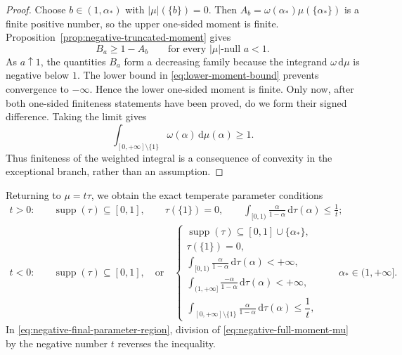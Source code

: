 \documentclass[aps,pra,11pt,onecolumn,nofootinbib,tightenlines]{revtex4-2}
\theoremstyle{definition}
\begin{document}
\begin{proof}
Choose $b\in(1,\alpha_*)$ with $|\mu|(\{b\})=0$. Then $A_b=\omega(\alpha_*)\mu(\{\alpha_*\})$ is a finite positive number, so the upper one-sided moment is finite. Proposition~\ref{prop:negative-truncated-moment} gives
\begin{equation}
 B_a\geq1-A_b
 \qquad\text{for every $|\mu|$-null }a<1.
 \label{eq:lower-moment-bound}
\end{equation}
As $a\uparrow1$, the quantities $B_a$ form a decreasing family because the integrand $\omega\,\mathrm d\mu$ is negative below $1$. The lower bound in \eqref{eq:lower-moment-bound} prevents convergence to $-\infty$. Hence the lower one-sided moment is finite. Only now, after both one-sided finiteness statements have been proved, do we form their signed difference. Taking the limit gives
\begin{equation}
 \int_{[0,+\infty]\setminus\{1\}}
 \omega(\alpha)\,\mathrm d\mu(\alpha)
 \geq1.
 \label{eq:negative-full-moment-mu}
\end{equation}
Thus finiteness of the weighted integral is a consequence of convexity in the exceptional branch, rather than an assumption.
\end{proof}

Returning to $\mu=t\tau$, we obtain the exact temperate parameter conditions
\begin{align}
 t>0:\quad&
 \operatorname{supp}(\tau)\subseteq[0,1],
 \qquad
 \tau(\{1\})=0,
 \qquad
 \int_{[0,1)}\frac{\alpha}{1-\alpha}\,\mathrm d\tau(\alpha)
 \leq\frac1t;
 \label{eq:positive-final-parameter-region}\\
 t<0:\quad&
 \operatorname{supp}(\tau)\subseteq[0,1],
 \quad\text{or}\quad
 \begin{cases}
  \operatorname{supp}(\tau)\subseteq[0,1]\cup\{\alpha_*\},\\
  \tau(\{1\})=0,\\
  \displaystyle\int_{[0,1)}\frac{\alpha}{1-\alpha}\,\mathrm d\tau(\alpha)<+\infty,\\
  \displaystyle\int_{(1,+\infty]}\frac{-\alpha}{1-\alpha}\,\mathrm d\tau(\alpha)<+\infty,\\
  \displaystyle
  \int_{[0,+\infty]\setminus\{1\}}
  \frac{\alpha}{1-\alpha}\,\mathrm d\tau(\alpha)
  \leq\dfrac1t,
 \end{cases}
 \qquad \alpha_*\in(1,+\infty].
 \label{eq:negative-final-parameter-region}
\end{align}
In \eqref{eq:negative-final-parameter-region}, division of \eqref{eq:negative-full-moment-mu} by the negative number $t$ reverses the inequality.
\end{document}
